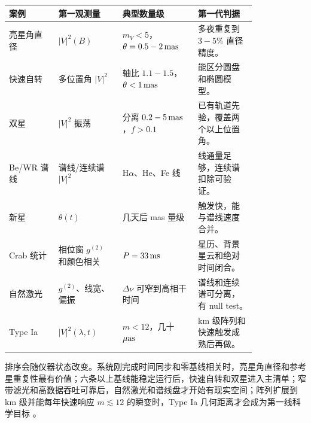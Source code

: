 \begin{longtable}{p{0.17\linewidth}p{0.22\linewidth}p{0.23\linewidth}p{0.20\linewidth}}
\toprule
案例 & 第一观测量 & 典型数量级 & 第一代判据 \\
\midrule
亮星角直径 & \(|V|^2(B)\) & \(m_V<5\)，\(\theta=0.5-2\,{\rm mas}\) & 多夜重复到 \(3-5\%\) 直径精度。 \\
快速自转 & 多位置角 \(|V|^2\) & 轴比 \(1.1-1.5\)，\(\theta<1\,{\rm mas}\) & 能区分圆盘和椭圆模型。 \\
双星 & \(|V|^2\) 振荡 & 分离 \(0.2-5\,{\rm mas}\)，\(f>0.1\) & 已有轨道先验，覆盖两个以上位置角。 \\
Be/WR 谱线 & 谱线/连续谱 \(|V|^2\) & H\(\alpha\)、He、Fe 线 & 线通量足够，连续谱扣除可验证。 \\
新星 & \(\theta(t)\) & 几天后 mas 量级 & 触发快，能与谱线速度合并。 \\
Crab 统计 & 相位窗 \(g^{(2)}\) 和颜色相关 & \(P=33\,{\rm ms}\) & 星历、背景星云和绝对时间闭合。 \\
自然激光 & \(g^{(2)}\)、线宽、偏振 & \(\Delta\nu\) 可窄到高相干时间 & 谱线和连续谱可分离，有 null test。 \\
Type Ia & \(|V|^2(\lambda,t)\) & \(m<12\)，几十 \(\mu{\rm as}\) & km 级阵列和快速触发成熟后再做。 \\
\bottomrule
\end{longtable}

排序会随仪器状态改变。系统刚完成时间同步和零基线相关时，亮星角直径和参考星重复性最有价值；六条以上基线能稳定运行后，快速自转和双星进入主清单；窄带滤光和高数据吞吐可靠后，自然激光和谱线盘才开始有现实空间；阵列扩展到 km 级并能每年快速响应 \(m\lesssim12\) 的瞬变时，Type Ia 几何距离才会成为第一线科学目标 \citep{2017MNRAS.472.4126G,2022MNRAS.512.1722K,2024MNRAS.529.4387A,2024ApJ...966...28A,2025ApJ...995..191A,2025PhRvD.111h3047K}。

